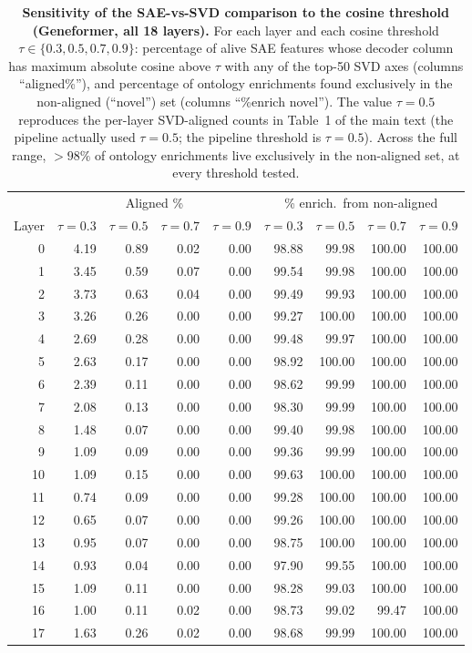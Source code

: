 \documentclass[11pt]{article}
\begin{document}
\begin{table}[H]
\centering
\caption{\textbf{Sensitivity of the SAE-vs-SVD comparison to the cosine threshold (Geneformer, all 18 layers).} For each layer and each cosine threshold $\tau \in \{0.3, 0.5, 0.7, 0.9\}$: percentage of alive SAE features whose decoder column has maximum absolute cosine above $\tau$ with any of the top-50 SVD axes (columns ``aligned\%''), and percentage of ontology enrichments found exclusively in the non-aligned (``novel'') set (columns ``\%enrich novel''). The value $\tau{=}0.5$ reproduces the per-layer SVD-aligned counts in Table~1 of the main text (the pipeline actually used $\tau{=}0.5$; the pipeline threshold is $\tau{=}0.5$). Across the full range, $>98\%$ of ontology enrichments live exclusively in the non-aligned set, at every threshold tested.}
\label{tab:svd_sweep}
\smallskip
\small
\begin{tabular}{r|rrrr|rrrr}
\toprule
& \multicolumn{4}{c|}{Aligned \%} & \multicolumn{4}{c}{\% enrich.\ from non-aligned} \\
Layer & $\tau{=}0.3$ & $\tau{=}0.5$ & $\tau{=}0.7$ & $\tau{=}0.9$ & $\tau{=}0.3$ & $\tau{=}0.5$ & $\tau{=}0.7$ & $\tau{=}0.9$ \\
\midrule
0  & 4.19 & 0.89 & 0.02 & 0.00 & 98.88 & 99.98 & 100.00 & 100.00 \\
1  & 3.45 & 0.59 & 0.07 & 0.00 & 99.54 & 99.98 & 100.00 & 100.00 \\
2  & 3.73 & 0.63 & 0.04 & 0.00 & 99.49 & 99.93 & 100.00 & 100.00 \\
3  & 3.26 & 0.26 & 0.00 & 0.00 & 99.27 & 100.00 & 100.00 & 100.00 \\
4  & 2.69 & 0.28 & 0.00 & 0.00 & 99.48 & 99.97 & 100.00 & 100.00 \\
5  & 2.63 & 0.17 & 0.00 & 0.00 & 98.92 & 100.00 & 100.00 & 100.00 \\
6  & 2.39 & 0.11 & 0.00 & 0.00 & 98.62 & 99.99 & 100.00 & 100.00 \\
7  & 2.08 & 0.13 & 0.00 & 0.00 & 98.30 & 99.99 & 100.00 & 100.00 \\
8  & 1.48 & 0.07 & 0.00 & 0.00 & 99.40 & 99.98 & 100.00 & 100.00 \\
9  & 1.09 & 0.09 & 0.00 & 0.00 & 99.36 & 99.99 & 100.00 & 100.00 \\
10 & 1.09 & 0.15 & 0.00 & 0.00 & 99.63 & 100.00 & 100.00 & 100.00 \\
11 & 0.74 & 0.09 & 0.00 & 0.00 & 99.28 & 100.00 & 100.00 & 100.00 \\
12 & 0.65 & 0.07 & 0.00 & 0.00 & 99.26 & 100.00 & 100.00 & 100.00 \\
13 & 0.95 & 0.07 & 0.00 & 0.00 & 98.75 & 100.00 & 100.00 & 100.00 \\
14 & 0.93 & 0.04 & 0.00 & 0.00 & 97.90 & 99.55 & 100.00 & 100.00 \\
15 & 1.09 & 0.11 & 0.00 & 0.00 & 98.28 & 99.03 & 100.00 & 100.00 \\
16 & 1.00 & 0.11 & 0.02 & 0.00 & 98.73 & 99.02 & 99.47 & 100.00 \\
17 & 1.63 & 0.26 & 0.02 & 0.00 & 98.68 & 99.99 & 100.00 & 100.00 \\
\bottomrule
\end{tabular}
\end{table}
\end{document}
